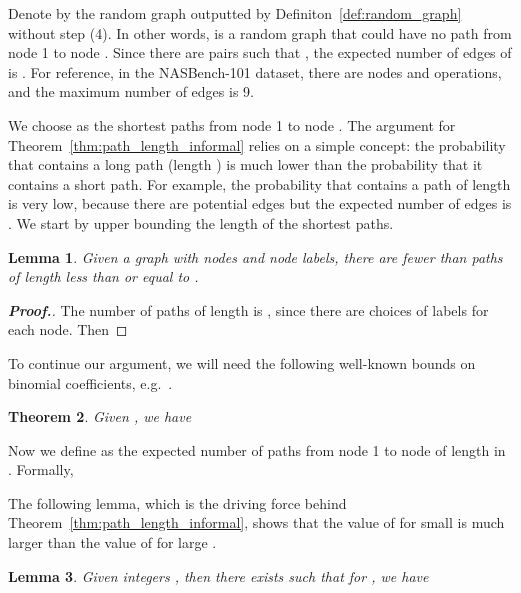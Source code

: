 \documentclass[11pt]{article}
\numberwithin{equation}{section}
\numberwithin{figure}{section}
\theoremstyle{plain}
\newtheorem{theorem}{Theorem}[section]
\newtheorem{lemma}[theorem]{Lemma}
\theoremstyle{definition}
\begin{document}
Denote by  the random graph outputted by
Definiton~\ref{def:random_graph} without step (4).
In other words,  is a random graph that
could have no path from node 1 to node .
Since there are  pairs  such that
, the expected number of edges of  is .
For reference, in the NASBench-101 dataset, there are  nodes
and  operations, and the maximum number of edges is 9.


We choose  as the  shortest paths
from node 1 to node .
The argument for Theorem~\ref{thm:path_length_informal}
relies on a simple concept:
the probability that  contains a
long path (length ) 
is much lower than the probability that it contains a short path.
For example, the probability that
 contains a path of length 
is very low,
because there are  potential edges 
but the expected number of edges is .
We start by upper bounding the length of the  shortest paths.

\begin{lemma} \label{lem:path_length}
Given a graph with  nodes and  node labels, 
there are fewer than  paths of length 
less than or equal to .
\end{lemma}

\begin{proof}[\textbf{Proof.}]
The number of paths of length  is , since there
are  choices of labels for each node.
Then

\end{proof}

To continue our argument, we will need the following well-known
bounds on binomial coefficients, e.g.\ \cite{stanica2001good}.

\begin{theorem} \label{thm:binomial}
Given , we have

\end{theorem}

Now we define  as the expected number of paths
from node 1 to node  of length  in .
Formally,

The following lemma, which is the driving force behind
Theorem~\ref{thm:path_length_informal}, shows that the value of
 for small  is much larger than 
the value of  for large .

\begin{lemma} \label{lem:a_nk}
Given integers , 
then there exists  such that for , we have

\end{lemma}
\end{document}

